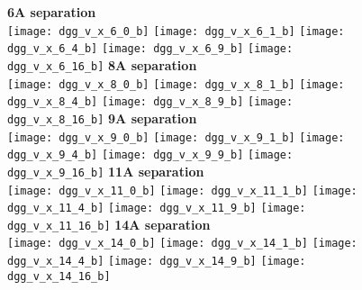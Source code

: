 \documentclass[journal=acsnano,manuscript=article]{achemso}
\begin{document}
\begin{figure}[h!]
	\centering
	\textbf{6A separation} \\
	\texttt{[image: dgg\_v\_x\_6\_0\_b]} 
	\texttt{[image: dgg\_v\_x\_6\_1\_b]}
	\texttt{[image: dgg\_v\_x\_6\_4\_b]}
	\texttt{[image: dgg\_v\_x\_6\_9\_b]}
	\texttt{[image: dgg\_v\_x\_6\_16\_b]}
	\textbf{8A separation} \\
	\texttt{[image: dgg\_v\_x\_8\_0\_b]} 
	\texttt{[image: dgg\_v\_x\_8\_1\_b]}
	\texttt{[image: dgg\_v\_x\_8\_4\_b]}
	\texttt{[image: dgg\_v\_x\_8\_9\_b]}
	\texttt{[image: dgg\_v\_x\_8\_16\_b]}
	\textbf{9A separation} \\
	\texttt{[image: dgg\_v\_x\_9\_0\_b]} 
	\texttt{[image: dgg\_v\_x\_9\_1\_b]}
	\texttt{[image: dgg\_v\_x\_9\_4\_b]}
	\texttt{[image: dgg\_v\_x\_9\_9\_b]}
	\texttt{[image: dgg\_v\_x\_9\_16\_b]}
	\textbf{11A separation} \\
	\texttt{[image: dgg\_v\_x\_11\_0\_b]} 
	\texttt{[image: dgg\_v\_x\_11\_1\_b]}
	\texttt{[image: dgg\_v\_x\_11\_4\_b]}
	\texttt{[image: dgg\_v\_x\_11\_9\_b]}
	\texttt{[image: dgg\_v\_x\_11\_16\_b]}
	\textbf{14A separation} \\
	\texttt{[image: dgg\_v\_x\_14\_0\_b]} 
	\texttt{[image: dgg\_v\_x\_14\_1\_b]}
	\texttt{[image: dgg\_v\_x\_14\_4\_b]}
	\texttt{[image: dgg\_v\_x\_14\_9\_b]}
	\texttt{[image: dgg\_v\_x\_14\_16\_b]}
	\label{fig:ang}
\end{figure}
\end{document}
